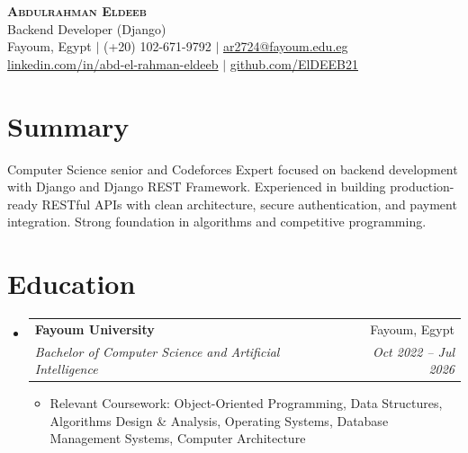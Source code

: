 \documentclass[a4paper,11pt]{article}
\makeatletter
\newcommand{\resumeItem}[1]{\item\small{#1}\vspace{-2pt}}
\newcommand{\resumeSubheading}[4]{
  \vspace{-2pt}\item
    \begin{tabular*}{\textwidth}[t]{l@{\extracolsep{\fill}}r}
      \textbf{#1} & \small #2 \\
      \textit{\small#3} & \textit{\small #4} \\
    \end{tabular*}\vspace{-7pt}
}
\newcommand{\resumeSubHeadingListStart}{\begin{itemize}[leftmargin=0in, label={}]}
\newcommand{\resumeSubHeadingListEnd}{\end{itemize}}
\newcommand{\resumeItemListStart}{\begin{itemize}[leftmargin=0.15in]}
\newcommand{\resumeItemListEnd}{\end{itemize}\vspace{-5pt}}
\makeatother
\begin{document}
\begin{center}
  {\Huge\scshape\textbf{\color{primary}Abdulrahman Eldeeb}} \\[6pt]
  {\large\color{accent}Backend Developer (Django)} \\[8pt]
  \small
  \hspace{2pt} Fayoum, Egypt \hspace{8pt}$|$\hspace{8pt}
  \hspace{2pt} (+20) 102-671-9792 \hspace{8pt}$|$\hspace{8pt}
  \hspace{2pt} \href{mailto:ar2724@fayoum.edu.eg}{\color{linkblue}ar2724@fayoum.edu.eg} \\[4pt]
  \hspace{2pt} \href{https://linkedin.com/in/abd-el-rahman-eldeeb}{\color{linkblue}linkedin.com/in/abd-el-rahman-eldeeb} \hspace{8pt}$|$\hspace{8pt}
  \hspace{2pt} \href{https://github.com/ElDEEB21}{\color{linkblue}github.com/ElDEEB21}
\end{center}

\section{Summary}
\small{
  Computer Science senior and Codeforces Expert focused on backend development with Django and Django REST Framework. Experienced in building production-ready RESTful APIs with clean architecture, secure authentication, and payment integration. Strong foundation in algorithms and competitive programming.
}

\section{Education}
\resumeSubHeadingListStart
  \resumeSubheading
    {Fayoum University}{Fayoum, Egypt}
    {Bachelor of Computer Science and Artificial Intelligence}{Oct 2022 -- Jul 2026}
    \resumeItemListStart
      \resumeItem{Relevant Coursework: Object-Oriented Programming, Data Structures, Algorithms Design \& Analysis, Operating Systems, Database Management Systems, Computer Architecture}
    \resumeItemListEnd
\resumeSubHeadingListEnd
\end{document}
